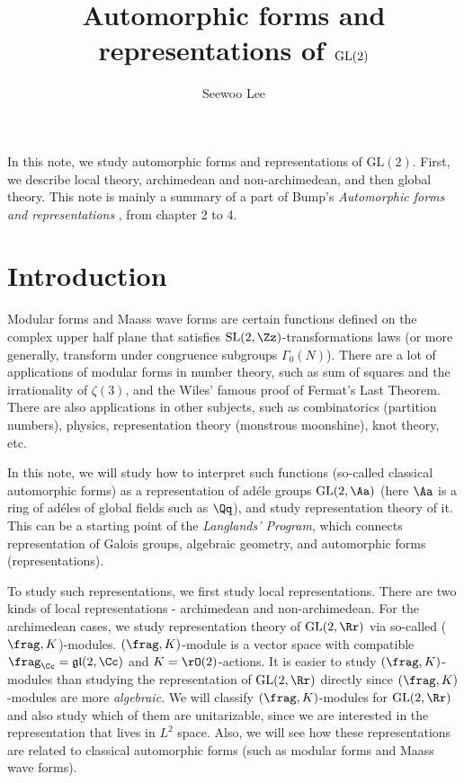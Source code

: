 \documentclass{article}
\title{Automorphic forms and representations of $\GL(2)$}
\author{Seewoo Lee}
\newcommand{\GL}{\mathrm{GL}}
\newcommand{\SL}{\mathrm{SL}}
\begin{document}
\maketitle
In this note, we study automorphic forms and representations of $\GL(2)$. First, we describe local theory, archimedean and non-archimedean, and then global theory. This note is mainly a summary of a  part of  Bump's \emph{Automorphic forms and representations} \cite{bu}, from chapter 2 to 4. 


\tableofcontents
\newpage
\section{Introduction}

Modular forms and Maass wave forms are certain functions defined on the complex upper half plane that satisfies $\SL(2, \Zz)$-transformations laws (or more generally, transform under congruence subgroups $\Gamma_{0}(N)$). 
There are a lot of applications of modular forms in number theory, such as sum of squares and the irrationality of $\zeta(3)$, and the Wiles' famous proof of Fermat's Last Theorem. 
There are also applications in other subjects, such as combinatorics (partition numbers), physics, representation theory (monstrous moonshine), knot theory, etc. 
 
In this note, we will study how to interpret such functions (so-called classical automorphic forms) as a representation of ad\'ele groups $\GL(2, \Aa)$ (here $\Aa$ is a ring of ad\'eles of global fields such as $\Qq$), and study representation theory of it. 
This can be a starting point of the \emph{Langlands' Program}, which connects representation of Galois groups, algebraic geometry, and automorphic forms (representations). 

To study such representations, we first study local representations. 
There are two kinds of local representations - archimedean and non-archimedean. 
For the archimedean cases, we study representation theory of $\GL(2, \Rr)$  via so-called ($\frag, K$)-modules. $(\frag, K)$-module is a vector space with compatible $\frag_{\Cc} = \mathfrak{gl}(2, \Cc)$ and $K = \rO(2)$-actions. It is easier to study $(\frag, K)$-modules than studying the representation of $\GL(2, \Rr)$ directly since $(\frag, K)$-modules are more \emph{algebraic}. We will classify $(\frag, K)$-modules for $\GL(2, \Rr)$ and also study which of them are unitarizable, since we are interested in the representation that lives in $L^{2}$ space. Also, we will see how these representations are related to classical automorphic forms (such as modular forms and Maass wave forms). 
\end{document}
